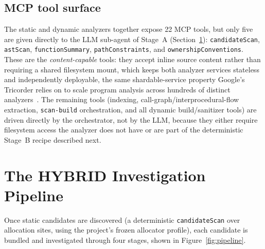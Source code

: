 \documentclass[11pt,a4paper]{article}
\begin{document}
\subsection{MCP tool surface}

The static and dynamic analyzers together expose 22 MCP tools, but only
five are given directly to the LLM sub-agent of Stage~A
(Section~\ref{sec:pipeline}): \texttt{candidateScan}, \texttt{astScan},
\texttt{functionSummary}, \texttt{pathConstraints}, and
\texttt{ownershipConventions}. These are the \emph{content-capable} tools:
they accept inline source content rather than requiring a shared
filesystem mount, which keeps both analyzer services stateless and
independently deployable, the same shardable-service property Google's
Tricorder relies on to scale program analysis across hundreds of
distinct analyzers~\cite{tricorder}. The remaining tools (indexing,
call-graph/interprocedural-flow extraction, \texttt{scan-build}
orchestration, and all dynamic build/sanitizer tools) are driven directly
by the orchestrator, not by the LLM, because they either require
filesystem access the analyzer does not have or are part of the
deterministic Stage~B recipe described next.

\section{The HYBRID Investigation Pipeline}
\label{sec:pipeline}

Once static candidates are discovered (a deterministic
\texttt{candidateScan} over allocation sites, using the project's frozen
allocator profile), each candidate is bundled and investigated through
four stages, shown in Figure~\ref{fig:pipeline}.
\end{document}
